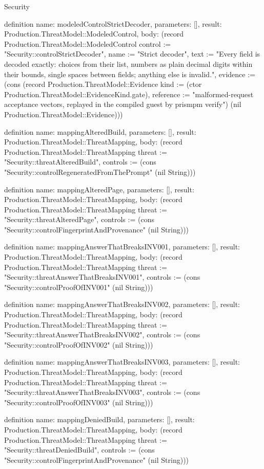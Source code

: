 \begin{lexlean}{Security}
\begin{semanticmodule}
definition{
  name: modeledControlStrictDecoder,
  parameters: [],
  result: Production.ThreatModel::ModeledControl,
  body: (record Production.ThreatModel::ModeledControl {control := "Security::controlStrictDecoder", name := "Strict decoder", text := "Every field is decoded exactly: choices from their list, numbers as plain decimal digits within their bounds, single spaces between fields; anything else is invalid.", evidence := (cons (record Production.ThreatModel::Evidence {kind := (ctor Production.ThreatModel::EvidenceKind.gate), reference := "malformed-request acceptance vectors, replayed in the compiled guest by prismpm verify"}) (nil Production.ThreatModel::Evidence))})
}

definition{
  name: mappingAlteredBuild,
  parameters: [],
  result: Production.ThreatModel::ThreatMapping,
  body: (record Production.ThreatModel::ThreatMapping {threat := "Security::threatAlteredBuild", controls := (cons "Security::controlRegeneratedFromThePrompt" (nil String))})
}

definition{
  name: mappingAlteredPage,
  parameters: [],
  result: Production.ThreatModel::ThreatMapping,
  body: (record Production.ThreatModel::ThreatMapping {threat := "Security::threatAlteredPage", controls := (cons "Security::controlFingerprintAndProvenance" (nil String))})
}

definition{
  name: mappingAnswerThatBreaksINV001,
  parameters: [],
  result: Production.ThreatModel::ThreatMapping,
  body: (record Production.ThreatModel::ThreatMapping {threat := "Security::threatAnswerThatBreaksINV001", controls := (cons "Security::controlProofOfINV001" (nil String))})
}

definition{
  name: mappingAnswerThatBreaksINV002,
  parameters: [],
  result: Production.ThreatModel::ThreatMapping,
  body: (record Production.ThreatModel::ThreatMapping {threat := "Security::threatAnswerThatBreaksINV002", controls := (cons "Security::controlProofOfINV002" (nil String))})
}

definition{
  name: mappingAnswerThatBreaksINV003,
  parameters: [],
  result: Production.ThreatModel::ThreatMapping,
  body: (record Production.ThreatModel::ThreatMapping {threat := "Security::threatAnswerThatBreaksINV003", controls := (cons "Security::controlProofOfINV003" (nil String))})
}

definition{
  name: mappingDeniedBuild,
  parameters: [],
  result: Production.ThreatModel::ThreatMapping,
  body: (record Production.ThreatModel::ThreatMapping {threat := "Security::threatDeniedBuild", controls := (cons "Security::controlFingerprintAndProvenance" (nil String))})
}


\end{semanticmodule}
\end{lexlean}
